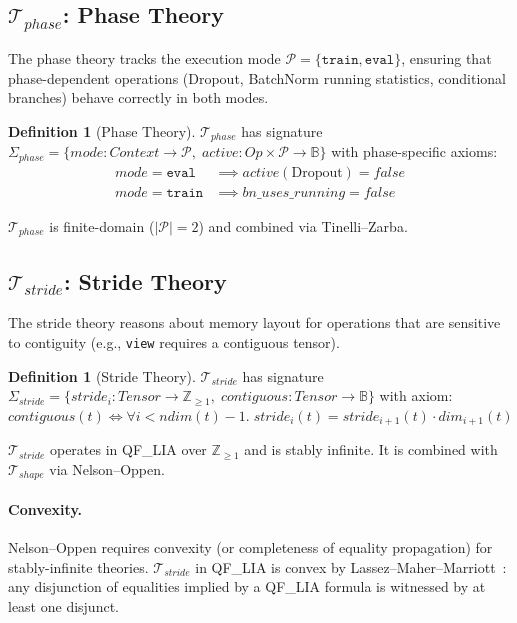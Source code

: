 \documentclass[10pt]{article}
\newcommand{\Tshape}{\mathcal{T}_{\mathit{shape}}}
\newcommand{\Tphase}{\mathcal{T}_{\mathit{phase}}}
\newcommand{\Tstride}{\mathcal{T}_{\mathit{stride}}}
\theoremstyle{plain}
\theoremstyle{definition}
\newtheorem{definition}[theorem]{Definition}
\theoremstyle{remark}
\begin{document}
\subsection{$\Tphase$: Phase Theory}\label{sec:tphase}

The phase theory tracks the execution mode
$\mathcal{P} = \{\texttt{train}, \texttt{eval}\}$, ensuring that
phase-dependent operations (Dropout, BatchNorm running statistics,
conditional branches) behave correctly in both modes.

\begin{definition}[Phase Theory]
$\Tphase$ has signature
$\Sigma_{\mathit{phase}} = \{
  \mathit{mode} : \mathit{Context} \to \mathcal{P},\;
  \mathit{active} : \mathit{Op} \times \mathcal{P} \to \mathbb{B}
\}$
with phase-specific axioms:
\begin{align}
  \mathit{mode} = \texttt{eval} &\implies
    \mathit{active}(\text{Dropout}) = \mathit{false}
    \label{ax:dropout} \\
  \mathit{mode} = \texttt{train} &\implies
    \mathit{bn\_uses\_running} = \mathit{false}
    \label{ax:bn}
\end{align}
\end{definition}

$\Tphase$ is finite-domain ($|\mathcal{P}| = 2$) and combined via
Tinelli--Zarba.

\subsection{$\Tstride$: Stride Theory}\label{sec:tstride}

The stride theory reasons about memory layout for operations that
are sensitive to contiguity (e.g., \texttt{view} requires a
contiguous tensor).

\begin{definition}[Stride Theory]
$\Tstride$ has signature
$\Sigma_{\mathit{stride}} = \{
  \mathit{stride}_i : \mathit{Tensor} \to \mathbb{Z}_{\geq 1},\;
  \mathit{contiguous} : \mathit{Tensor} \to \mathbb{B}
\}$
with axiom:
$\mathit{contiguous}(t) \iff
  \forall i < \mathit{ndim}(t) - 1.\;
  \mathit{stride}_i(t) = \mathit{stride}_{i+1}(t) \cdot
  \mathit{dim}_{i+1}(t)$
\end{definition}

$\Tstride$ operates in QF\_LIA over $\mathbb{Z}_{\geq 1}$ and is
stably infinite.  It is combined with $\Tshape$ via Nelson--Oppen.

\paragraph{Convexity.}
Nelson--Oppen requires convexity (or completeness of equality
propagation) for stably-infinite theories.  $\Tstride$ in QF\_LIA
is convex by Lassez--Maher--Marriott~\cite{lassez88}: any disjunction
of equalities implied by a QF\_LIA formula is witnessed by at least
one disjunct.
\end{document}
